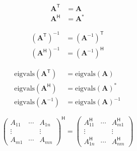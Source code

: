\noindent\begin{align*}
    {\mathbf{A}}^\mathsf{T} & = \mathbf{A}   \\
    {\mathbf{A}}^\mathsf{H} & = \mathbf{A}^*
\end{align*}

\noindent\begin{align*}
    {(\mathbf{A}^\mathsf{T})}^{-1} & = {(\mathbf{A}^{-1})}^\mathsf{T} \\
    {(\mathbf{A}^\mathsf{H})}^{-1} & = {(\mathbf{A}^{-1})}^\mathsf{H}
\end{align*}

\noindent\begin{align*}
    \mathrm{eigvals}(\mathbf{A}^\mathsf{T}) & = \mathrm{eigvals}(\mathbf{A})        \\
    \mathrm{eigvals}(\mathbf{A}^\mathsf{H}) & = \mathrm{eigvals}{(\mathbf{A})}^*    \\
    \mathrm{eigvals}(\mathbf{A}^{-1})       & = \mathrm{eigvals}{(\mathbf{A})}^{-1}
\end{align*}

\noindent\begin{equation*}
    \begin{pmatrix}
        A_{11} & \cdots & A_{1n} \\
        \vdots &        & \vdots \\
        A_{m1} & \cdots & A_{mn}
    \end{pmatrix}^\mathsf{H}=
    \begin{pmatrix}
        A_{11}^\mathsf{H} & \cdots & A_{m1}^\mathsf{H} \\
        \vdots            &        & \vdots            \\
        A_{1n}^\mathsf{H} & \cdots & A_{nm}^\mathsf{H}
    \end{pmatrix}
\end{equation*}

